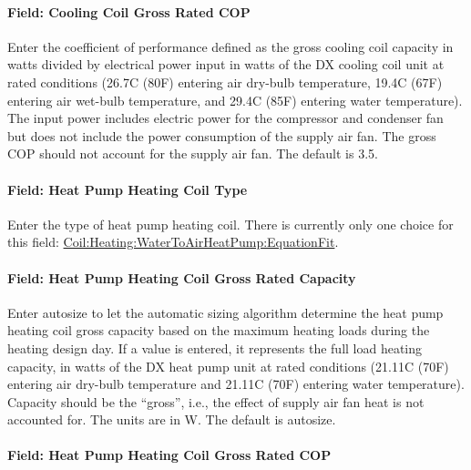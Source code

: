 \paragraph{Field: Cooling Coil Gross Rated COP}\label{field-cooling-coil-gross-rated-cop-1}

Enter the coefficient of performance defined as the gross cooling coil capacity in watts divided by electrical power input in watts of the DX cooling coil unit at rated conditions (26.7C (80F) entering air dry-bulb temperature, 19.4C (67F) entering air wet-bulb temperature, and 29.4C (85F) entering water temperature). The input power includes electric power for the compressor and condenser fan but does not include the power consumption of the supply air fan. The gross COP should not account for the supply air fan. The default is 3.5.

\paragraph{Field: Heat Pump Heating Coil Type}\label{field-heat-pump-heating-coil-type-1}

Enter the type of heat pump heating coil. There is currently only one choice for this field:
 \hyperref[coilheatingwatertoairheatpumpequationfit]{Coil:Heating:WaterToAirHeatPump:EquationFit}.

\paragraph{Field: Heat Pump Heating Coil Gross Rated Capacity}\label{field-heat-pump-heating-coil-gross-rated-capacity-1}

Enter autosize to let the automatic sizing algorithm determine the heat pump heating coil gross capacity based on the maximum heating loads during the heating design day. If a value is entered, it represents the full load heating capacity, in watts of the DX heat pump unit at rated conditions (21.11C (70F) entering air dry-bulb temperature and 21.11C (70F) entering water temperature). Capacity should be the ``gross'', i.e., the effect of supply air fan heat is not accounted for. The units are in W. The default is autosize.

\paragraph{Field: Heat Pump Heating Coil Gross Rated COP}\label{field-heat-pump-heating-coil-gross-rated-cop-1}

